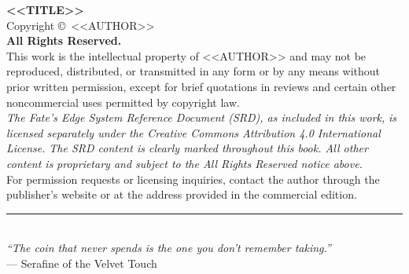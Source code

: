 \cleardoublepage
\thispagestyle{empty}
\begin{center}
  \vspace*{2in}
  \textbf{<<TITLE>>}\\[0.2in]
  Copyright \copyright\ <<AUTHOR>>\\[0.2in]
  \textbf{All Rights Reserved.}\\[0.1in]
  This work is the intellectual property of <<AUTHOR>> and may not be reproduced,
  distributed, or transmitted in any form or by any means without prior written permission,
  except for brief quotations in reviews and certain other noncommercial uses permitted
  by copyright law.\\[0.2in]
  \textit{The Fate's Edge System Reference Document (SRD), as included in this work,}
  \textit{is licensed separately under the Creative Commons Attribution 4.0 International License.}
  \textit{The SRD content is clearly marked throughout this book. All other content is}
  \textit{proprietary and subject to the All Rights Reserved notice above.}\\[0.2in]
  For permission requests or licensing inquiries, contact the author through the
  publisher's website or at the address provided in the commercial edition.\\[0.2in]
  \rule{0.5\textwidth}{0.4pt}\\[0.2in]
  \textit{``The coin that never spends is the one you don't remember taking.''}\\[0.1in]
  --- Serafine of the Velvet Touch
\end{center}
\cleardoublepage